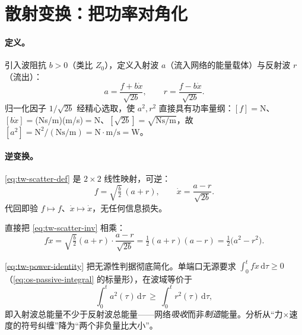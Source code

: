 \section{散射变换：把功率对角化}
\label{sec:tw-scattering}

\paragraph{定义。}
引入波阻抗 $b>0$（类比 $Z_0$），定义入射波 $a$（流入网络的能量载体）与反射波 $r$（流出）：
\begin{equation}
  a=\frac{f+b\dot x}{\sqrt{2b}},\qquad
  r=\frac{f-b\dot x}{\sqrt{2b}}.
  \label{eq:tw-scatter-def}
\end{equation}
归一化因子 $1/\sqrt{2b}$ 经精心选取，使 $a^2,r^2$ 直接具有功率量纲：$[f]=$N、$[b\dot x]=$(Ns/m)(m/s)$=$N、$[\sqrt{2b}]=\sqrt{\text{Ns/m}}$，故 $[a^2]=\text{N}^2/(\text{Ns/m})=\text{N}\!\cdot\!\text{m/s}=$W。

\paragraph{逆变换。}
\cref{eq:tw-scatter-def} 是 $2\times2$ 线性映射，可逆：
\begin{equation}
  f=\sqrt{\tfrac{b}{2}}\,(a+r),\qquad
  \dot x=\frac{a-r}{\sqrt{2b}}.
  \label{eq:tw-scatter-inv}
\end{equation}
代回即验 $f\mapsto f$、$\dot x\mapsto\dot x$，无任何信息损失。

\begin{derivation}[功率恒等式]
直接把 \cref{eq:tw-scatter-inv} 相乘：
\begin{equation}
  f\dot x=\sqrt{\tfrac{b}{2}}(a+r)\cdot\frac{a-r}{\sqrt{2b}}
        =\tfrac12(a+r)(a-r)=\boxed{\tfrac12\big(a^2-r^2\big)}.
  \label{eq:tw-power-identity}
\end{equation}
\end{derivation}

\cref{eq:tw-power-identity} 把无源性判据彻底简化。单端口无源要求 $\int_0^t f\dot x\,\mathrm d\tau\ge0$（\cref{eq:os-passive-integral} 的标量形），在波域等价于
\begin{equation}
  \int_0^t a^2(\tau)\,\mathrm d\tau\ \ge\ \int_0^t r^2(\tau)\,\mathrm d\tau,
  \label{eq:tw-passive-wave}
\end{equation}
即入射波总能量不少于反射波总能量——网络\emph{吸收}而非\emph{制造}能量。分析从“力$\times$速度的符号纠缠”降为“两个非负量比大小”。

